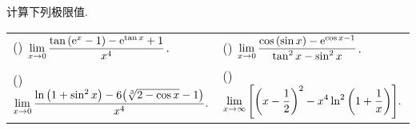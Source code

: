 \begin{example}
    计算下列极限值.
    \setcounter{magicrownumbers}{0}
    \begin{table}[H]
        \centering
        \begin{tabular}{l | l}
            (\rownumber{}) $\displaystyle\lim_{x\to0}\dfrac{\tan\qty(\mathrm{e} ^x-1)-\mathrm{e} ^{\tan x}+1}{x^4}$.                & (\rownumber{}) $\displaystyle\lim_{x\to0}\dfrac{\cos\qty(\sin x)-\mathrm{e} ^{\cos x-1}}{\tan ^2x-\sin ^2x}$.      \\
            (\rownumber{}) $\displaystyle \lim_{x\to0}\dfrac{\ln\qty(1+\sin^2x)-6\qty(\sqrt[3]{2-\cos x}-1)}{x^4}.$ & (\rownumber{}) $\displaystyle \lim_{x\to\infty}\qty[\qty(x-\dfrac{1}{2})^2-x^4\ln^2\qty(1+\dfrac{1}{x})].$
        \end{tabular}
    \end{table}
\end{example}
